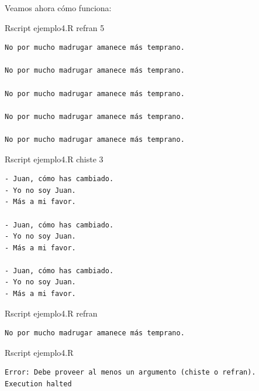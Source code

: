 \documentclass[
]{book}
\newenvironment{Shaded}{\begin{snugshade}}{\end{snugshade}}
\newcommand{\ExtensionTok}[1]{#1}
\newcommand{\NormalTok}[1]{#1}
\begin{document}
Veamos ahora cómo funciona:

\begin{Shaded}
\begin{Highlighting}[]
\ExtensionTok{Rscript}\NormalTok{ ejemplo4.R refran 5}
\end{Highlighting}
\end{Shaded}

\begin{verbatim}
No por mucho madrugar amanece más temprano.

No por mucho madrugar amanece más temprano.

No por mucho madrugar amanece más temprano.

No por mucho madrugar amanece más temprano.

No por mucho madrugar amanece más temprano.
\end{verbatim}

\begin{Shaded}
\begin{Highlighting}[]
\ExtensionTok{Rscript}\NormalTok{ ejemplo4.R chiste 3}
\end{Highlighting}
\end{Shaded}

\begin{verbatim}
- Juan, cómo has cambiado.
- Yo no soy Juan.
- Más a mi favor.

- Juan, cómo has cambiado.
- Yo no soy Juan.
- Más a mi favor.

- Juan, cómo has cambiado.
- Yo no soy Juan.
- Más a mi favor.
\end{verbatim}

\begin{Shaded}
\begin{Highlighting}[]
\ExtensionTok{Rscript}\NormalTok{ ejemplo4.R refran}
\end{Highlighting}
\end{Shaded}

\begin{verbatim}
No por mucho madrugar amanece más temprano.
\end{verbatim}

\begin{Shaded}
\begin{Highlighting}[]
\ExtensionTok{Rscript}\NormalTok{ ejemplo4.R}
\end{Highlighting}
\end{Shaded}

\begin{verbatim}
Error: Debe proveer al menos un argumento (chiste o refran).
Execution halted
\end{verbatim}
\end{document}

